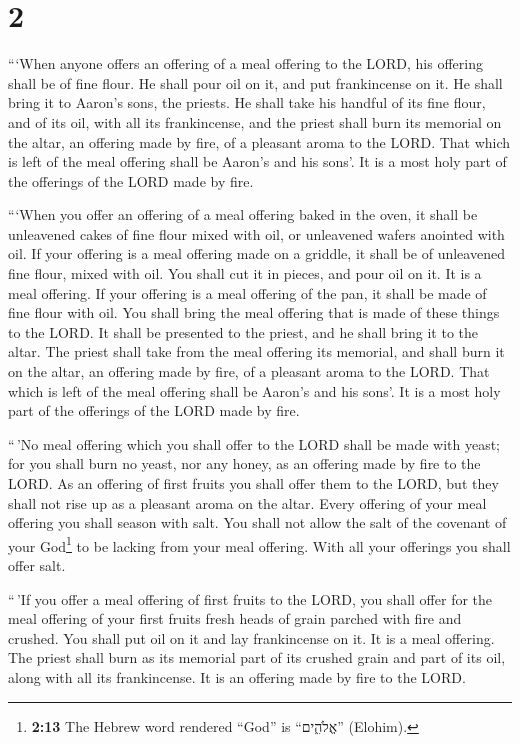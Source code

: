 \hypertarget{section-1}{%
\section{2}\label{section-1}}

 ```When anyone offers an offering of a meal offering to
the LORD, his offering shall be of fine flour. He shall pour oil on it,
and put frankincense on it.  He shall bring it to Aaron's
sons, the priests. He shall take his handful of its fine flour, and of
its oil, with all its frankincense, and the priest shall burn its
memorial on the altar, an offering made by fire, of a pleasant aroma to
the LORD.  That which is left of the meal offering shall
be Aaron's and his sons'. It is a most holy part of the offerings of the
LORD made by fire.

 ```When you offer an offering of a meal offering baked in
the oven, it shall be unleavened cakes of fine flour mixed with oil, or
unleavened wafers anointed with oil.  If your offering is
a meal offering made on a griddle, it shall be of unleavened fine flour,
mixed with oil.  You shall cut it in pieces, and pour oil
on it. It is a meal offering.  If your offering is a meal
offering of the pan, it shall be made of fine flour with oil.
 You shall bring the meal offering that is made of these
things to the LORD. It shall be presented to the priest, and he shall
bring it to the altar.  The priest shall take from the
meal offering its memorial, and shall burn it on the altar, an offering
made by fire, of a pleasant aroma to the LORD.  That
which is left of the meal offering shall be Aaron's and his sons'. It is
a most holy part of the offerings of the LORD made by fire.

 ``\,'No meal offering which you shall offer to the LORD
shall be made with yeast; for you shall burn no yeast, nor any honey, as
an offering made by fire to the LORD.  As an offering of
first fruits you shall offer them to the LORD, but they shall not rise
up as a pleasant aroma on the altar.  Every offering of
your meal offering you shall season with salt. You shall not allow the
salt of the covenant of your God\footnote{\textbf{2:13} The Hebrew word
  rendered ``God'' is ``אֱלֹהִ֑ים'' (Elohim).} to be lacking from your
meal offering. With all your offerings you shall offer salt.

 ``\,'If you offer a meal offering of first fruits to the
LORD, you shall offer for the meal offering of your first fruits fresh
heads of grain parched with fire and crushed.  You shall
put oil on it and lay frankincense on it. It is a meal offering.
 The priest shall burn as its memorial part of its
crushed grain and part of its oil, along with all its frankincense. It
is an offering made by fire to the LORD.

